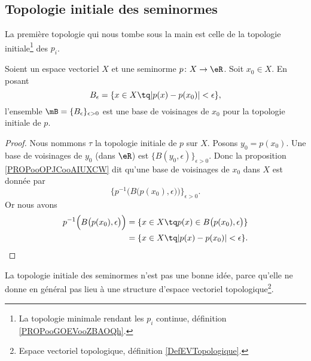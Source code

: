 \subsection{Topologie initiale des seminormes}


La première topologie qui nous tombe sous la main est celle de la topologie initiale\footnote{La topologie minimale rendant les \( p_i\) continue, définition \ref{PROPooGOEVooZBAOQh}.} des \( p_i\).

\begin{proposition}		\label{PROPooVUYTooJXkRYW}
	Soient un espace vectoriel \( X\) et une seminorme \(p \colon X\to \eR \). Soit \( x_0\in X\). En posant
	\begin{equation}
		B_{\epsilon}=\{ x\in X\tq | p(x)-p(x_0) |<\epsilon \},
	\end{equation}
	l'ensemble \( \mB= \{ B_{\epsilon} \}_{\epsilon>0}\) est une base de voisinages de \( x_0\) pour la topologie initiale de \( p\).
\end{proposition}

\begin{proof}
	Nous nommons \( \tau\) la topologie initiale de \( p\) sur \( X\). Posons \( y_0=p(x_0)\). Une base de voisinages de \( y_0\) (dans \( \eR\)) est \( \{ B(y_0,\epsilon) \}_{\epsilon>0}\). Donc la proposition \ref{PROPooOPJCooAIUXCW} dit qu'une base de voisinages de \( x_0\) dans \( X\) est donnée par
	\begin{equation}
		\{ p^{-1}\Big( B\big( p(x_0),\epsilon \big) \Big) \}_{\epsilon>0}.
	\end{equation}
	Or nous avons
	\begin{subequations}
		\begin{align}
			p^{-1}\Big( B\big( p(x_0),\epsilon \big) \Big) & =\{ x\in X\tq p(x)\in B\big( p(x_0),\epsilon \big) \} \\
			                                               & =\{ x\in X\tq | p(x)-p(x_0) |<\epsilon \}.
		\end{align}
	\end{subequations}
\end{proof}

La topologie initiale des seminormes n'est pas une bonne idée, parce qu'elle ne donne en général pas lieu à une structure d'espace vectoriel topologique\footnote{Espace vectoriel topologique, définition \ref{DefEVTopologique}.}.

